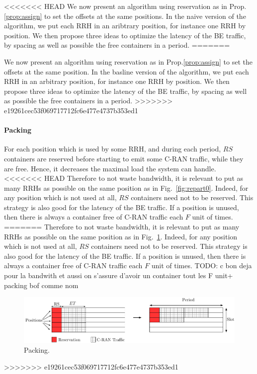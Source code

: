 \documentclass[10pt, conference, letterpaper]{IEEEtran}
\newcommand{\todo}[1]{{\color{red} TODO: {#1}}}
\begin{document}
<<<<<<< HEAD
We now present an algorithm using reservation as in Prop.\ref{prop:assign} to set the offsets at the same positions.
In the naive version of the algorithm, we put each RRH in an aribtrary position, for instance one RRH by position.
 We then propose three ideas to optimize the latency of the BE traffic, by spacing as well as possible the free containers in a period. 
=======

We now present an algorithm using reservation as in Prop.\ref{prop:assign} to set the offsets at the same position.
In the basline version of the algorithm, we put each RRH in an arbitrary position, for instance one RRH by position.
 We then propose three ideas to optimize the latency of the BE traffic, by spacing as well as possible the free containers in a period.
>>>>>>> e19261cec53f069717712fc6e477e4737b353ed1


\paragraph{Packing}

For each position which is used by some RRH, and during each period, $RS$ containers are reserved before starting to emit some C-RAN traffic, while they are free. Hence, it decreases the maximal load the system can handle.
<<<<<<< HEAD
Therefore to not waste bandwidth, it is relevant to put as many RRHs as possible on the same position as in Fig.~\ref{fig:repart0}. Indeed, for any position which is not used at all, $RS$ containers need not to be reserved. This strategy is also good for the latency of the BE traffic. If a position is unused, then there is always a container free of C-RAN traffic each $F$ unit of times. 
=======
Therefore to not waste bandwidth, it is relevant to put as many RRHs as possible on the same position as in Fig.~\ref{fig:packing}. Indeed, for any position which is not used at all, $RS$ containers need not to be reserved. This strategy is also good for the latency of the BE traffic. If a position is unused, then there is always a container free of C-RAN traffic each $F$ unit of times. 
\todo{c bon deja pour la bandwith et aussi on s'assure d'avoir un container tout les F unit+ packing bof comme nom}
\begin{figure}[h!]
\begin{center}   

      \includegraphics[scale=0.5]{repart0}
     \caption{Packing.}\label{fig:packing}
     
\end{center}
  \end{figure}
>>>>>>> e19261cec53f069717712fc6e477e4737b353ed1
\end{document}
